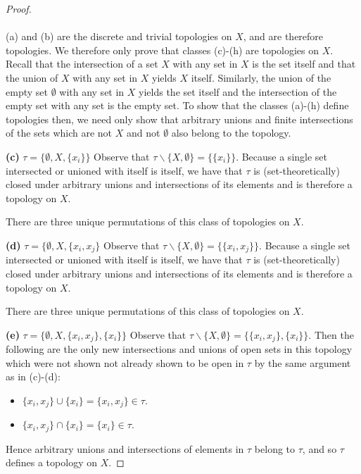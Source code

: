 \begin{proof}\ \\\\
    (a) and (b) are the discrete and trivial topologies on $X$, and are therefore topologies. We therefore only prove
    that classes (c)-(h) are topologies on $X$. Recall that the intersection of a set $X$ with any set in $X$ is the set
    itself and that the union of $X$ with any set in $X$ yields $X$ itself. Similarly, the union of the empty set 
    $\emptyset$ with any set in $X$ yields the set itself and the intersection of the empty set with any set is the 
    empty set. To show that the classes (a)-(h) define topologies then, we need only show that arbitrary unions and 
    finite intersections of the sets which are not $X$ and not $\emptyset$ also belong to the topology.

    \textbf{(c)} $\tau = \{\emptyset, X, \{x_i\}\}$
        Observe that $\tau \backslash \{X, \emptyset\} = \{\{x_i\}\}$.
        Because a single set intersected or unioned with itself is itself, we have that $\tau$ is (set-theoretically) 
        closed under arbitrary unions and intersections of its elements and is therefore a topology on $X$.

        There are three unique permutations of this class of topologies on $X$.
    
    \textbf{(d)} $\tau = \{\emptyset, X, \{x_i, x_j\}$
        Observe that $\tau \backslash \{X, \emptyset\} = \{\{x_i, x_j\}\}$.
        Because a single set intersected or unioned with itself is itself, we have that $\tau$ is (set-theoretically) 
        closed under arbitrary unions and intersections of its elements and is therefore a topology on $X$.
        
        There are three unique permutations of this class of topologies on $X$.
    
    \pagebreak
    \textbf{(e)} $\tau = \{\emptyset, X, \{x_i, x_j\}, \{x_i\}\}$
        Observe that $\tau \backslash \{X, \emptyset\} = \{\{x_i, x_j\}, \{x_i\}\}$.
        Then the following are the only new intersections and unions of open sets in this topology which were not shown
        not already shown to be open in $\tau$ by the same argument as in (c)-(d):
        
        \begin{itemize}
            \item $\{x_i, x_j\} \cup \{x_i\} = \{x_i, x_j\} \in \tau$.
            \item $\{x_i, x_j\} \cap \{x_i\} = \{x_i\} \in \tau$.
        \end{itemize}
        Hence arbitrary unions and intersections of elements in $\tau$ belong to $\tau$, and so $\tau$ defines a 
        topology on $X$.
        

\end{proof}
